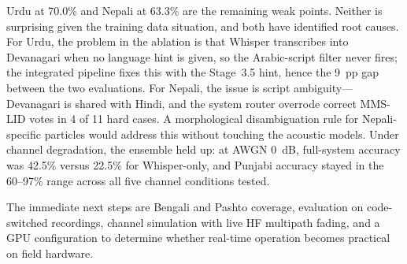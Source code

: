 \documentclass[12pt, onecolumn]{IEEEtran}
\begin{document}
Urdu at 70.0\% and Nepali at 63.3\% are the remaining weak points. Neither is surprising given the training data situation, and both have identified root causes. For Urdu, the problem in the ablation is that Whisper transcribes into Devanagari when no language hint is given, so the Arabic-script filter never fires; the integrated pipeline fixes this with the Stage~3.5 hint, hence the 9~pp gap between the two evaluations. For Nepali, the issue is script ambiguity---Devanagari is shared with Hindi, and the system router overrode correct MMS-LID votes in 4 of 11 hard cases. A morphological disambiguation rule for Nepali-specific particles would address this without touching the acoustic models. Under channel degradation, the ensemble held up: at AWGN 0~dB, full-system accuracy was 42.5\% versus 22.5\% for Whisper-only, and Punjabi accuracy stayed in the 60--97\% range across all five channel conditions tested.

The immediate next steps are Bengali and Pashto coverage, evaluation on code-switched recordings, channel simulation with live HF multipath fading, and a GPU configuration to determine whether real-time operation becomes practical on field hardware.
\end{document}
